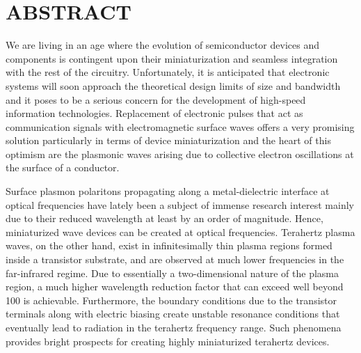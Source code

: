 %
%
%

\chapter*{ABSTRACT}

\pagestyle{plain} %
\setcounter{page}{2}

\indent We are living in an age where the evolution of semiconductor devices and components is contingent upon their miniaturization and seamless integration  with the rest of the circuitry. Unfortunately, it is anticipated that electronic systems will soon approach the theoretical design limits of size and bandwidth and it poses to be a serious concern for the development of high-speed information technologies. Replacement of electronic pulses that act as communication signals with electromagnetic surface waves offers a very promising solution particularly in terms of device miniaturization and the heart of this optimism are the plasmonic waves arising due to collective electron oscillations at the surface of a conductor.

Surface plasmon polaritons propagating along a metal-dielectric interface at optical frequencies have lately been a subject of immense research interest mainly due to their reduced wavelength at least by an order of magnitude. Hence, miniaturized wave devices can be created at optical frequencies. Terahertz plasma waves, on the other hand, exist in infinitesimally thin plasma regions formed inside a transistor substrate, and are observed at much lower frequencies in the far-infrared regime. Due to essentially a two-dimensional nature of the plasma region, a much higher wavelength reduction factor that can exceed well beyond 100 is achievable. Furthermore, the boundary conditions due to the transistor terminals along with electric biasing create unstable resonance conditions that eventually lead to radiation in the terahertz frequency range. Such phenomena provides bright prospects for creating highly miniaturized terahertz devices.

